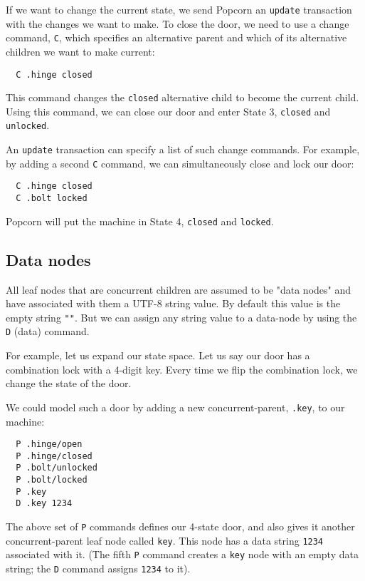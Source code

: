 \documentclass[12pt]{article}
\begin{document}
If we want to change the current state, we send Popcorn an \verb`update`
transaction with the changes we want to make. To close the door, we
need to use a change command, \verb`C`, which specifies an alternative
parent and which of its alternative children we want to make current:

\begin{verbatim}
  C .hinge closed
\end{verbatim}

This command changes the \verb`closed` alternative child to become the
current child. Using this command, we can close our door and enter
State 3, \verb`closed` and \verb`unlocked`.

An \verb`update` transaction can specify a list of such change
commands. For example, by adding a second \verb`C` command, we can
simultaneously close and lock our door:

\begin{verbatim}
  C .hinge closed
  C .bolt locked
\end{verbatim}

Popcorn will put the machine in State 4, \verb`closed` and \verb`locked`.

\subsection{Data nodes}

All leaf nodes that are concurrent children are assumed to be "data
nodes" and have associated with them a UTF-8 string value. By default
this value is the empty string \verb`""`. But we can assign any string
value to a data-node by using the \verb`D` (data) command.

For example, let us expand our state space. Let us say our door has a
combination lock with a 4-digit key. Every time we flip the
combination lock, we change the state of the door.

We could model such a door by adding a new concurrent-parent, \verb`.key`,
to our machine:

\begin{verbatim}
  P .hinge/open
  P .hinge/closed
  P .bolt/unlocked
  P .bolt/locked
  P .key
  D .key 1234
\end{verbatim}

The above set of \verb`P` commands defines our 4-state door, and also gives
it another concurrent-parent leaf node called \verb`key`. This node has a
data string \verb`1234` associated with it. (The fifth \verb`P` command creates
a \verb`key` node with an empty data string; the \verb`D` command assigns \verb`1234`
to it).
\end{document}
